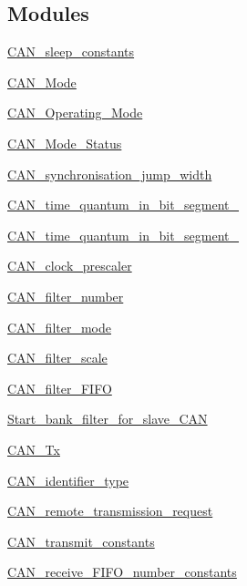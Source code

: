 \subsection*{Modules}
\begin{DoxyCompactItemize}
\item 
\hyperlink{group___c_a_n__sleep__constants}{C\+A\+N\+\_\+sleep\+\_\+constants}
\item 
\hyperlink{group___c_a_n___mode}{C\+A\+N\+\_\+\+Mode}
\item 
\hyperlink{group___c_a_n___operating___mode}{C\+A\+N\+\_\+\+Operating\+\_\+\+Mode}
\item 
\hyperlink{group___c_a_n___mode___status}{C\+A\+N\+\_\+\+Mode\+\_\+\+Status}
\item 
\hyperlink{group___c_a_n__synchronisation__jump__width}{C\+A\+N\+\_\+synchronisation\+\_\+jump\+\_\+width}
\item 
\hyperlink{group___c_a_n__time__quantum__in__bit__segment__1}{C\+A\+N\+\_\+time\+\_\+quantum\+\_\+in\+\_\+bit\+\_\+segment\+\_}
\item 
\hyperlink{group___c_a_n__time__quantum__in__bit__segment__2}{C\+A\+N\+\_\+time\+\_\+quantum\+\_\+in\+\_\+bit\+\_\+segment\+\_}
\item 
\hyperlink{group___c_a_n__clock__prescaler}{C\+A\+N\+\_\+clock\+\_\+prescaler}
\item 
\hyperlink{group___c_a_n__filter__number}{C\+A\+N\+\_\+filter\+\_\+number}
\item 
\hyperlink{group___c_a_n__filter__mode}{C\+A\+N\+\_\+filter\+\_\+mode}
\item 
\hyperlink{group___c_a_n__filter__scale}{C\+A\+N\+\_\+filter\+\_\+scale}
\item 
\hyperlink{group___c_a_n__filter___f_i_f_o}{C\+A\+N\+\_\+filter\+\_\+\+F\+I\+FO}
\item 
\hyperlink{group___start__bank__filter__for__slave___c_a_n}{Start\+\_\+bank\+\_\+filter\+\_\+for\+\_\+slave\+\_\+\+C\+AN}
\item 
\hyperlink{group___c_a_n___tx}{C\+A\+N\+\_\+\+Tx}
\item 
\hyperlink{group___c_a_n__identifier__type}{C\+A\+N\+\_\+identifier\+\_\+type}
\item 
\hyperlink{group___c_a_n__remote__transmission__request}{C\+A\+N\+\_\+remote\+\_\+transmission\+\_\+request}
\item 
\hyperlink{group___c_a_n__transmit__constants}{C\+A\+N\+\_\+transmit\+\_\+constants}
\item 
\hyperlink{group___c_a_n__receive___f_i_f_o__number__constants}{C\+A\+N\+\_\+receive\+\_\+\+F\+I\+F\+O\+\_\+number\+\_\+constants}

\end{DoxyCompactItemize}
